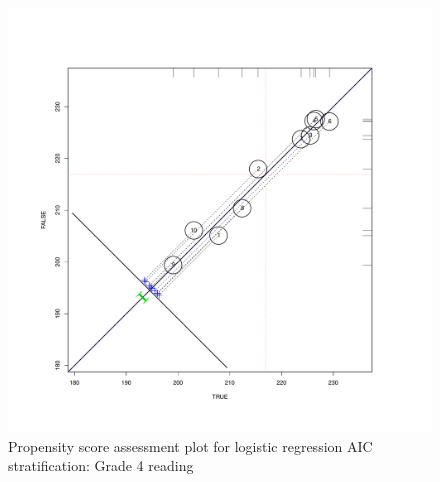 \begin{figure}
\begin{center}
\includegraphics[height=.4\textheight,width=.4\textheight]{../Figures2009/g4read-circpsa10-AIC.pdf}
\caption{Propensity score assessment plot for logistic regression AIC stratification: Grade 4 reading}
\end{center}
\end{figure}



\clearpage

